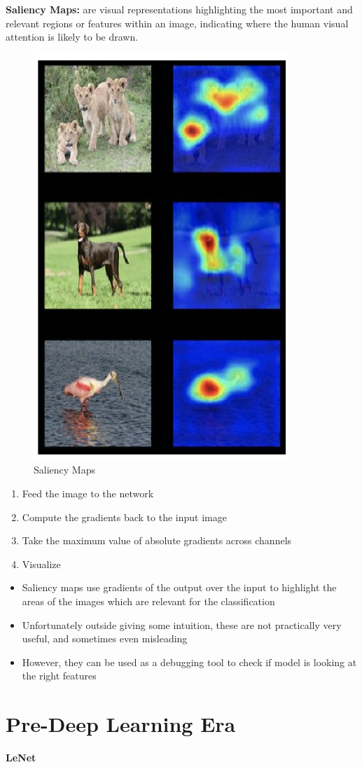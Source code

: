 \begin{definition}
    \textbf{Saliency Maps:} are visual representations highlighting the most important and relevant regions or features within an image, indicating where the human visual attention is likely to be drawn.
\end{definition}

\begin{figure}[h!t]
    \centering
    \includegraphics[width=0.25\linewidth]{saliencymap.png}
    \caption{Saliency Maps}
    \label{fig:enter-label}
\end{figure}

\begin{enumerate}
    \item Feed the image to the network
    \item Compute the gradients back to the input image
    \item Take the maximum value of absolute gradients across channels
    \item Visualize
\end{enumerate}

\begin{itemize}
    \item Saliency maps use gradients of the output over the input to highlight the areas of the images which are relevant for the classification
    \item Unfortunately outside giving some intuition, these are not practically very useful, and sometimes even misleading
    \item However, they can be used as a debugging tool to check if model is looking at the right features
\end{itemize}
\newpage

\section{Pre-Deep Learning Era}

\textbf{LeNet}


